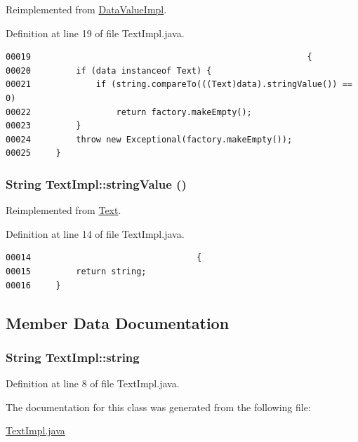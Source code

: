 Reimplemented from \hyperlink{classDataValueImpl_a5}{Data\-Value\-Impl}.

Definition at line 19 of file Text\-Impl.java.\footnotesize\begin{verbatim}00019                                                       {
00020         if (data instanceof Text) {
00021             if (string.compareTo(((Text)data).stringValue()) == 0)
00022                 return factory.makeEmpty();
00023         }
00024         throw new Exceptional(factory.makeEmpty());
00025     }
\end{verbatim}\normalsize 
\hypertarget{classTextImpl_a0}{
\subsubsection[stringValue]{\setlength{\rightskip}{0pt plus 5cm}String Text\-Impl::string\-Value ()}}
\label{classTextImpl_a0}




Reimplemented from \hyperlink{interfaceText_a0}{Text}.

Definition at line 14 of file Text\-Impl.java.\footnotesize\begin{verbatim}00014                                 {
00015         return string;
00016     }
\end{verbatim}\normalsize 


\subsection{Member Data Documentation}
\hypertarget{classTextImpl_o0}{
\subsubsection[string]{\setlength{\rightskip}{0pt plus 5cm}String Text\-Impl::string}}
\label{classTextImpl_o0}




Definition at line 8 of file Text\-Impl.java.

The documentation for this class was generated from the following file:\begin{CompactItemize}
\item 
\hyperlink{TextImpl_8java-source}{Text\-Impl.java}\end{CompactItemize}
